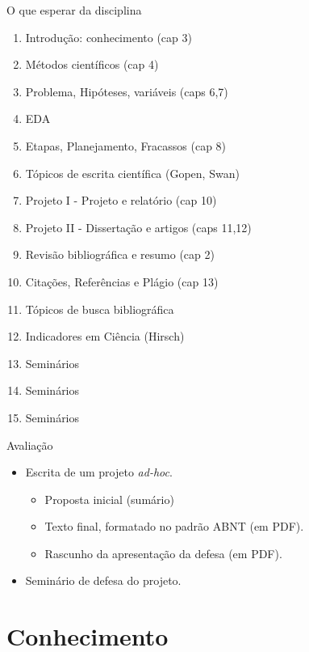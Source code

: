 \documentclass{beamer}
\begin{document}
\begin{frame}{O que esperar da disciplina}
  \begin{enumerate}
  \item<2> {Introdução: conhecimento} (cap 3)
  \item<2> {Métodos científicos} (cap 4)
  \item<3> {Problema, Hipóteses, variáveis} (caps 6,7)
  \item<3> {EDA}
  \item<3> {Etapas, Planejamento, Fracassos} (cap 8)
  \item<4,7> \alert<7>{Tópicos de escrita científica} (Gopen, Swan)
  \item<5> {Projeto I - Projeto e relatório} (cap 10)
  \item<5> {Projeto II - Dissertação e artigos} (caps 11,12)
  \item<5> {Revisão bibliográfica e resumo} (cap 2)
  \item<5> {Citações, Referências e Plágio} (cap 13)
  \item<6> {Tópicos de busca bibliográfica}
  \item<6,7> \alert<7>{Indicadores em Ciência} (Hirsch)
  \item<1-> Seminários
  \item<1-> Seminários
  \item<1-> Seminários
  \end{enumerate}
\end{frame}

\begin{frame}{Avaliação}
  \begin{itemize}
  \item Escrita de um projeto {\em ad-hoc}.
    \begin{itemize}
    \item Proposta inicial (sumário)
    \item Texto final, formatado no padrão ABNT (em PDF).
    \item Rascunho da apresentação da defesa (em PDF).
    \end{itemize}
  \item Seminário de defesa do projeto.
  \end{itemize}
\end{frame}

\section{Conhecimento}
\end{document}
